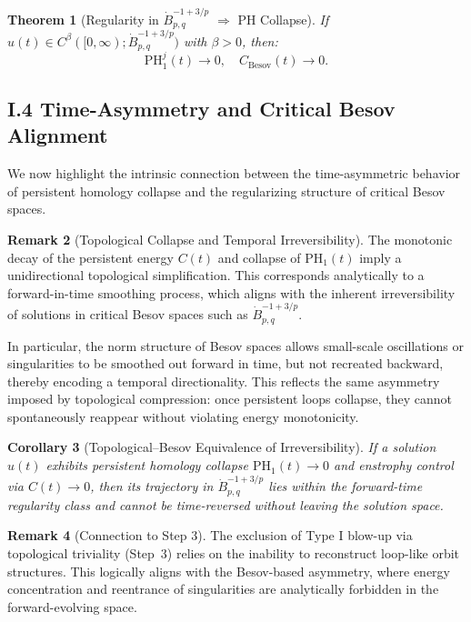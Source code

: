 \documentclass[11pt]{article}
\newtheorem{theorem}{Theorem}[section]
\newtheorem{corollary}[theorem]{Corollary}
\theoremstyle{definition}
\newtheorem{remark}[theorem]{Remark}
\begin{document}
\begin{theorem}[Regularity in $\dot{B}^{-1+3/p}_{p,q}$ $\Rightarrow$ PH Collapse]
If $u(t) \in C^\beta([0,\infty); \dot{B}^{-1+3/p}_{p,q})$ with $\beta > 0$, then:
\[
\mathrm{PH}^j_1(t) \to 0, \quad C_{\mathrm{Besov}}(t) \to 0.
\]
\end{theorem}

\subsection*{I.4 Time-Asymmetry and Critical Besov Alignment}

We now highlight the intrinsic connection between the time-asymmetric behavior of persistent homology collapse and the regularizing structure of critical Besov spaces.

\begin{remark}[Topological Collapse and Temporal Irreversibility]
The monotonic decay of the persistent energy $C(t)$ and collapse of $\mathrm{PH}_1(t)$ imply a unidirectional topological simplification. This corresponds analytically to a forward-in-time smoothing process, which aligns with the inherent irreversibility of solutions in critical Besov spaces such as $\dot{B}^{-1+3/p}_{p,q}$.

In particular, the norm structure of Besov spaces allows small-scale oscillations or singularities to be smoothed out forward in time, but not recreated backward, thereby encoding a temporal directionality. This reflects the same asymmetry imposed by topological compression: once persistent loops collapse, they cannot spontaneously reappear without violating energy monotonicity.
\end{remark}

\begin{corollary}[Topological–Besov Equivalence of Irreversibility]
If a solution $u(t)$ exhibits persistent homology collapse $\mathrm{PH}_1(t) \to 0$ and enstrophy control via $C(t) \to 0$, then its trajectory in $\dot{B}^{-1+3/p}_{p,q}$ lies within the forward-time regularity class and cannot be time-reversed without leaving the solution space.
\end{corollary}

\begin{remark}[Connection to Step 3]
The exclusion of Type I blow-up via topological triviality (Step~3) relies on the inability to reconstruct loop-like orbit structures. This logically aligns with the Besov-based asymmetry, where energy concentration and reentrance of singularities are analytically forbidden in the forward-evolving space.
\end{remark}
\end{document}
